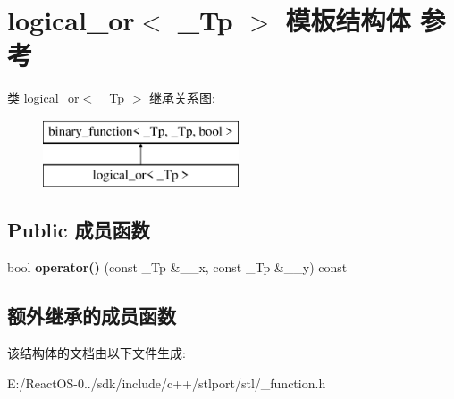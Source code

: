 \hypertarget{structlogical__or}{}\section{logical\+\_\+or$<$ \+\_\+\+Tp $>$ 模板结构体 参考}
\label{structlogical__or}
类 logical\+\_\+or$<$ \+\_\+\+Tp $>$ 继承关系图\+:\begin{figure}[H]
\begin{center}
\leavevmode
\includegraphics[height=2.000000cm]{structlogical__or}
\end{center}
\end{figure}
\subsection*{Public 成员函数}
\begin{DoxyCompactItemize}
\item 
\mbox{\label{structlogical__or_a4edbd7a7dd5f4d86c6e784be7d445e02}} 
bool {\bfseries operator()} (const \+\_\+\+Tp \&\+\_\+\+\_\+x, const \+\_\+\+Tp \&\+\_\+\+\_\+y) const
\end{DoxyCompactItemize}
\subsection*{额外继承的成员函数}


该结构体的文档由以下文件生成\+:\begin{DoxyCompactItemize}
\item 
E\+:/\+React\+O\+S-\/0../sdk/include/c++/stlport/stl/\+\_\+function.\+h\end{DoxyCompactItemize}
